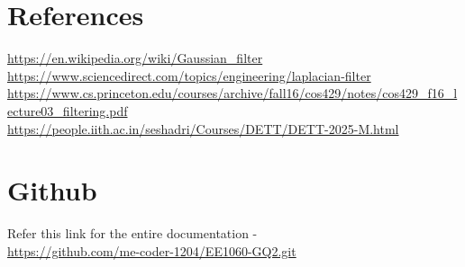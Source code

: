 \documentclass[12pt]{article}
\begin{document}
\section{\textbf{References}}
\href{https://en.wikipedia.org/wiki/Gaussian_filter}{https://en.wikipedia.org/wiki/Gaussian_filter} \\
\href{https://www.sciencedirect.com/topics/engineering/laplacian-filter}{https://www.sciencedirect.com/topics/engineering/laplacian-filter} \\
\href{https://www.cs.princeton.edu/courses/archive/fall16/cos429/notes/cos429_f16_lecture03_filtering.pdf}{https://www.cs.princeton.edu/courses/archive/fall16/cos429/notes/cos429_f16_lecture03_filtering.pdf} \\
\href{https://people.iith.ac.in/seshadri/Courses/DETT/DETT-2025-M.html}{https://people.iith.ac.in/seshadri/Courses/DETT/DETT-2025-M.html} \\

\section{Github}
Refer this link for the entire documentation - \\
\href{https://github.com/me-coder-1204/EE1060-GQ2.git}{https://github.com/me-coder-1204/EE1060-GQ2.git} 
\end{document}

